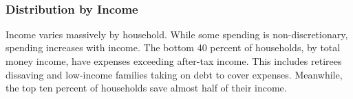 \begin{minipage}{0.76\textwidth}
\\
\vspace{1mm}
\end{minipage}
\newpage
\subsubsection*{Distribution by Income} 
\begin{minipage}{0.76\textwidth}  
\small Income varies massively by household. While some spending is non-discretionary, spending increases with income. The bottom 40 percent of households, by total money income, have expenses exceeding after-tax income. This includes retirees dissaving and low-income families taking on debt to cover expenses. Meanwhile, the top ten percent of households save almost half of their income.


\end{minipage}
\vspace{1mm}

